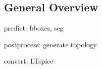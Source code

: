 \subsection{General Overview}

predict: bboxes, seg

postprocess: generate topology

convert: LTspice
